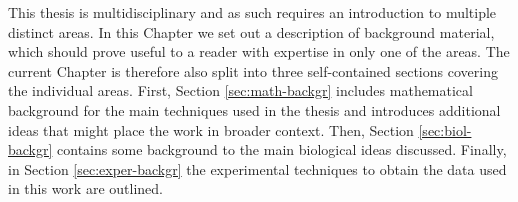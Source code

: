 
This thesis is multidisciplinary and as such requires an introduction to multiple distinct areas. In this Chapter we set out a description of background material, which should prove useful to a reader with expertise in only one of the areas. The current Chapter is therefore also split into three self-contained sections covering the individual areas. First, Section \ref{sec:math-backgr} includes mathematical background for the main techniques used in the thesis and introduces additional ideas that might place the work in broader context. Then, Section \ref{sec:biol-backgr} contains some background to the main biological ideas discussed. Finally, in Section \ref{sec:exper-backgr} the experimental techniques to obtain the data used in this work are outlined.


